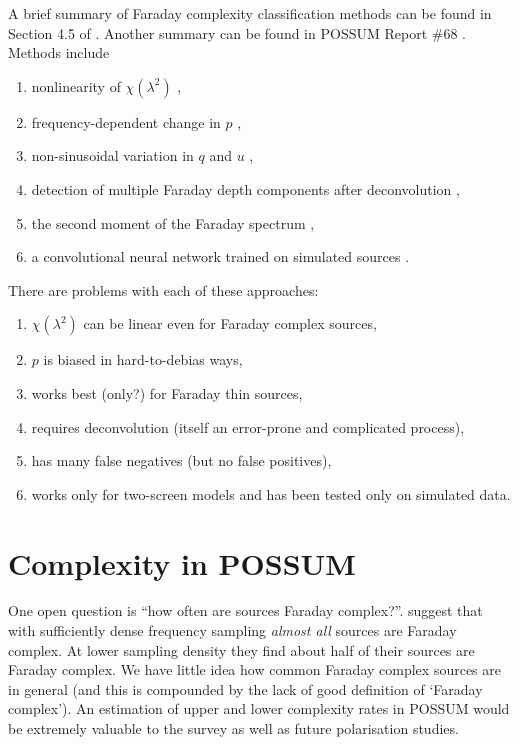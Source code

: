 \documentclass[a4paper]{article}
\begin{document}
    A brief summary of Faraday complexity classification methods can be found in Section 4.5 of \citet{anderson15faraday}. Another summary can be found in POSSUM Report \#68 \citep{purcell17complexity}. Methods include
    \begin{enumerate}
        \item nonlinearity of $\chi(\lambda^2)$ \citep{goldstein84-3c27},
        \item frequency-dependent change in $p$ \citep{farnes14catalogue},
        \item non-sinusoidal variation in $q$ and $u$ \citep{osullivan12agn},
        \item detection of multiple Faraday depth components after deconvolution \citep{law11spectropolarimetry},
        \item the second moment of the Faraday spectrum \citep{brown11report09},
        \item a convolutional neural network trained on simulated sources \citep{brown19classification}.
    \end{enumerate}
    There are problems with each of these approaches:
    \begin{enumerate}
        \item $\chi(\lambda^2)$ can be linear even for Faraday complex sources,
        \item $p$ is biased in hard-to-debias ways,
        \item works best (only?) for Faraday thin sources,
        \item requires deconvolution (itself an error-prone and complicated process),
        \item has many false negatives (but no false positives),
        \item works only for two-screen models and has been tested only on simulated data.
    \end{enumerate}

    \section{Complexity in POSSUM}

    One open question is ``how often are sources Faraday complex?''. \citet{anderson16faraday} suggest that with sufficiently dense frequency sampling \emph{almost all} sources are Faraday complex. At lower sampling density they find about half of their sources are Faraday complex. We have little idea how common Faraday complex sources are in general (and this is compounded by the lack of good definition of `Faraday complex'). An estimation of upper and lower complexity rates in POSSUM would be extremely valuable to the survey as well as future polarisation studies.
\end{document}
